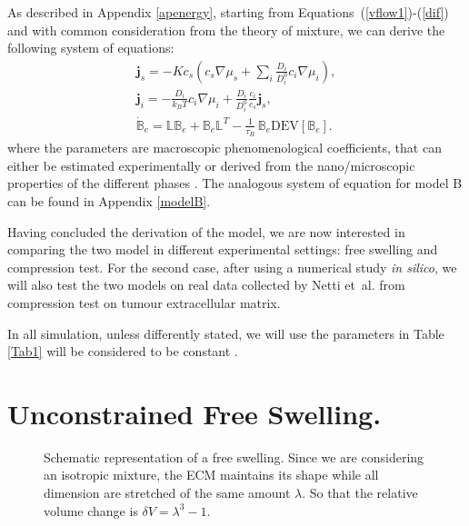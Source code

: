 \documentclass[runningheads]{llncs}
\newcommand{\LL}{\ensuremath{\mathbb{L}}}
\begin{document}
As described in Appendix \ref{apenergy}, starting from Equations~(\ref{vflow1})-(\ref{dif}) and with common consideration from the theory of mixture, we can derive the following system of equations:
\begin{eqnarray}
\mathbf{j}_s = -K c_s \left(c_s\nabla \mu_s +\sum_i \frac{D_i}{D^0_i} c_i \nabla \mu_i\right),\\
\mathbf{j}_i = - \frac{D_i}{k_B T}c_i\nabla \mu_i + \frac{D_i}{D^0_i} \frac{c_i}{c_s} \mathbf{j}_s, \\
\dot{\mathbb{B}}_e =\LL\mathbb{B}_e + \mathbb{B}_e \LL^T - \frac{1}{\tau_R} \,\mathbb{B}_e\text{DEV}[\mathbb{B}_e].\label{Be}
\end{eqnarray}
where the parameters are macroscopic phenomenological coefficients, that can either be estimated experimentally or derived from the nano/microscopic properties of the different phases \cite{ecm1,ecm2}. The analogous system of equation for model B can be found in Appendix \ref{modelB}. 

Having concluded the derivation of the model, we are now interested in comparing the two model in different experimental settings: free swelling and compression test. For the second case, after using a numerical study \textit{in silico}, we will also test the two models on real data collected by Netti et~al. \cite{Netti} from compression test on tumour extracellular matrix. 

In all simulation, unless differently stated, we will use the parameters in Table \ref{Tab1} will be considered to be constant \cite{Netti,ecm2}.
\section{Unconstrained Free Swelling.}
\label{free}
\begin{figure}
	\centering
	\def\svgwidth{0.95\linewidth}
	
	\caption{Schematic representation of a free swelling. Since we are considering an isotropic mixture, the ECM maintains its shape while all dimension are stretched of the same amount $\lambda$. So that the relative volume change is $\delta V = \lambda^3-1$. }
\end{figure}
\end{document}
